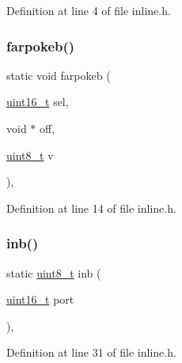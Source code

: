 Definition at line 4 of file inline.\+h.

\mbox{\label{a00026_a4e7b04b927c6dca2d20f54a5c14a01d6_a4e7b04b927c6dca2d20f54a5c14a01d6}} 
\subsubsection{\texorpdfstring{farpokeb()}{farpokeb()}}
{\footnotesize\ttfamily static void farpokeb (\begin{DoxyParamCaption}\item[{\hyperlink{a00023_a273cf69d639a59973b6019625df33e30_a273cf69d639a59973b6019625df33e30}{uint16\+\_\+t}}]{sel,  }\item[{void $\ast$}]{off,  }\item[{\hyperlink{a00023_aba7bc1797add20fe3efdf37ced1182c5_aba7bc1797add20fe3efdf37ced1182c5}{uint8\+\_\+t}}]{v }\end{DoxyParamCaption})\hspace{0.3cm}{\ttfamily [inline]}, {\ttfamily [static]}}



Definition at line 14 of file inline.\+h.

\mbox{\label{a00026_a0223c8898dfec29069879dc51076e28a_a0223c8898dfec29069879dc51076e28a}} 
\subsubsection{\texorpdfstring{inb()}{inb()}}
{\footnotesize\ttfamily static \hyperlink{a00023_aba7bc1797add20fe3efdf37ced1182c5_aba7bc1797add20fe3efdf37ced1182c5}{uint8\+\_\+t} inb (\begin{DoxyParamCaption}\item[{\hyperlink{a00023_a273cf69d639a59973b6019625df33e30_a273cf69d639a59973b6019625df33e30}{uint16\+\_\+t}}]{port }\end{DoxyParamCaption})\hspace{0.3cm}{\ttfamily [inline]}, {\ttfamily [static]}}



Definition at line 31 of file inline.\+h.

\mbox{\label{a00026_a20faed26baa341152aa32288418f1457_a20faed26baa341152aa32288418f1457}} 
